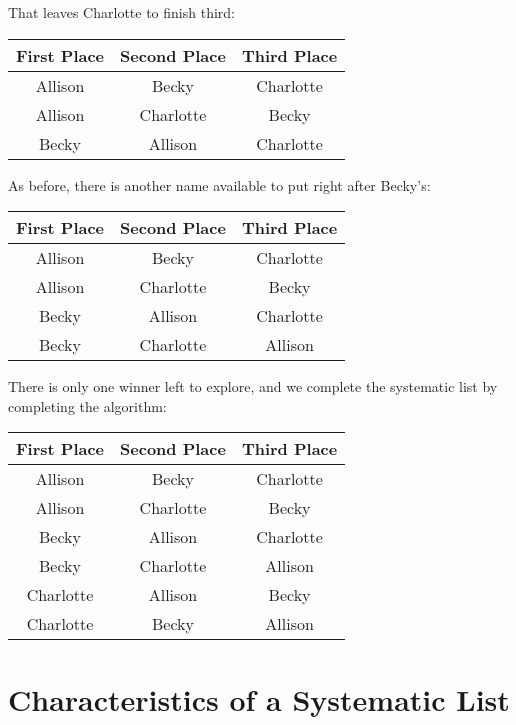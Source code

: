 That leaves Charlotte to finish third:

\begin{center}
    \begin{tabulary}{\textwidth}{CCC}
        First Place & Second Place & Third Place\\
        \hline
        Allison & Becky & Charlotte\\
        Allison & Charlotte & Becky\\
        Becky & Allison & Charlotte\\
    \end{tabulary}
\end{center}

As before, there is another name available to put right after Becky's:

\begin{center}
    \begin{tabulary}{\textwidth}{CCC}
        First Place & Second Place & Third Place\\
        \hline
        Allison & Becky & Charlotte\\
        Allison & Charlotte & Becky\\
        Becky & Allison & Charlotte\\
        Becky & Charlotte & Allison\\
    \end{tabulary}
\end{center}

There is only one winner left to explore, and we complete the systematic list by completing the algorithm:

\begin{center}
    \begin{tabulary}{\textwidth}{CCC}
        First Place & Second Place & Third Place\\
        \hline
        Allison & Becky & Charlotte\\
        Allison & Charlotte & Becky\\
        Becky & Allison & Charlotte\\
        Becky & Charlotte & Allison\\
        Charlotte & Allison & Becky\\
        Charlotte & Becky & Allison\\
    \end{tabulary}
\end{center}

\section{Characteristics of a Systematic List}

